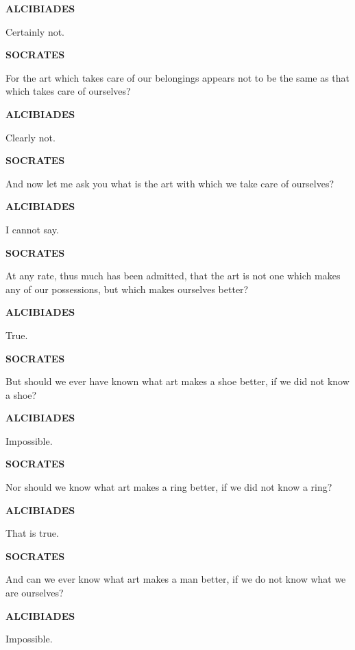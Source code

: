 \documentclass[11pt,letter]{article}
\begin{document}
\par \textbf{ALCIBIADES}
\par   Certainly not.

\par \textbf{SOCRATES}
\par   For the art which takes care of our belongings appears not to be the same as that which takes care of ourselves?

\par \textbf{ALCIBIADES}
\par   Clearly not.

\par \textbf{SOCRATES}
\par   And now let me ask you what is the art with which we take care of ourselves?

\par \textbf{ALCIBIADES}
\par   I cannot say.

\par \textbf{SOCRATES}
\par   At any rate, thus much has been admitted, that the art is not one which makes any of our possessions, but which makes ourselves better?

\par \textbf{ALCIBIADES}
\par   True.

\par \textbf{SOCRATES}
\par   But should we ever have known what art makes a shoe better, if we did not know a shoe?

\par \textbf{ALCIBIADES}
\par   Impossible.

\par \textbf{SOCRATES}
\par   Nor should we know what art makes a ring better, if we did not know a ring?

\par \textbf{ALCIBIADES}
\par   That is true.

\par \textbf{SOCRATES}
\par   And can we ever know what art makes a man better, if we do not know what we are ourselves?

\par \textbf{ALCIBIADES}
\par   Impossible.
\end{document}
